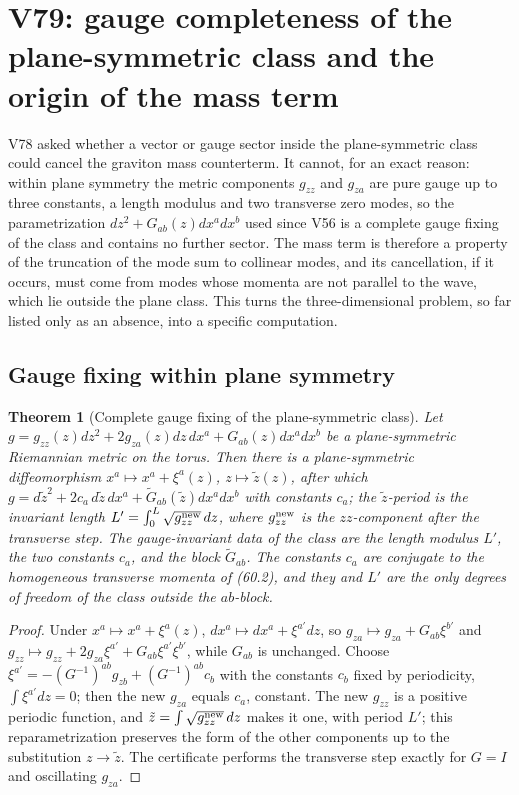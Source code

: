 \documentclass[11pt]{article}
\newtheorem{theorem}{Theorem}[section]
\theoremstyle{remark}
\begin{document}
\section{V79: gauge completeness of the plane-symmetric class and the origin of the mass term}
\label{sec:v19v79}

V78 asked whether a vector or gauge sector inside the plane-symmetric
class could cancel the graviton mass counterterm.  It cannot, for an
exact reason: within plane symmetry the metric components
\(g_{zz}\) and \(g_{za}\) are pure gauge up to three constants, a
length modulus and two transverse zero modes, so the parametrization
\(dz^2+G_{ab}(z)dx^adx^b\) used since V56 is a complete gauge fixing of
the class and contains no further sector.  The mass term is therefore
a property of the truncation of the mode sum to collinear modes, and
its cancellation, if it occurs, must come from modes whose momenta are
not parallel to the wave, which lie outside the plane class.  This
turns the three-dimensional problem, so far listed only as an absence,
into a specific computation.

\subsection{Gauge fixing within plane symmetry}

\begin{theorem}[Complete gauge fixing of the plane-symmetric class]
\label{thm:v19v79-gauge}
Let \(g=g_{zz}(z)dz^2+2g_{za}(z)dz\,dx^a+G_{ab}(z)dx^adx^b\) be a
plane-symmetric Riemannian metric on the torus.  Then there is a
plane-symmetric diffeomorphism \(x^a\mapsto x^a+\xi^a(z)\),
\(z\mapsto\tilde z(z)\), after which
\(g=d\tilde z^2+2c_a\,d\tilde z\,dx^a+\widetilde G_{ab}(\tilde z)dx^adx^b\)
with constants \(c_a\); the \(\tilde z\)-period is the invariant
length \(L'=\int_0^L\sqrt{g^{\rm new}_{zz}}\,dz\), where
\(g^{\rm new}_{zz}\) is the \(zz\)-component after the transverse
step.  The gauge-invariant data of the class are the length modulus
\(L'\), the two constants \(c_a\), and the block
\(\widetilde G_{ab}\).  The constants \(c_a\) are conjugate to the
homogeneous transverse momenta of (60.2), and they and \(L'\) are the
only degrees of freedom of the class outside the \(ab\)-block.
\end{theorem}

\begin{proof}
Under \(x^a\mapsto x^a+\xi^a(z)\), \(dx^a\mapsto dx^a+\xi^{a\prime}dz\),
so \(g_{za}\mapsto g_{za}+G_{ab}\xi^{b\prime}\) and
\(g_{zz}\mapsto g_{zz}+2g_{za}\xi^{a\prime}+G_{ab}\xi^{a\prime}\xi^{b\prime}\),
while \(G_{ab}\) is unchanged.  Choose
\(\xi^{a\prime}=-(G^{-1})^{ab}g_{zb}+(G^{-1})^{ab}c_b\) with the constants
\(c_b\) fixed by periodicity, \(\int\xi^{a\prime}dz=0\); then the new
\(g_{za}\) equals \(c_a\), constant.  The new \(g_{zz}\) is a positive
periodic function, and \(\tilde z=\int\sqrt{g_{zz}^{\rm new}}\,dz\)
makes it one, with period \(L'\); this reparametrization preserves the
form of the other components up to the substitution
\(z\to\tilde z\).  The certificate performs the transverse step exactly
for \(G=I\) and oscillating \(g_{za}\).
\end{proof}
\end{document}
